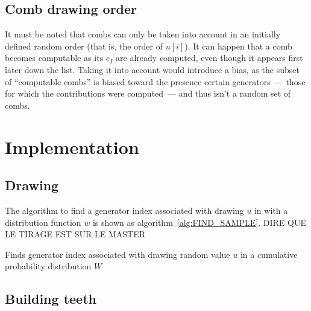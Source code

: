 \documentclass[./thesis.tex]{subfiles}
\begin{document}
\subsection{Comb drawing order}

It must be noted that combs can only be taken into account in an initially defined random order (that is, the order of $u[i]$).
It can happen that a comb becomes computable as its $e_I$ are already computed, even though it appears first later down the list. Taking it into account would introduce a bias, as the subset of ``computable combs'' is biased toward the presence certain generators ---~those for which the contributions were computed~--- and thus isn't a random set of combs.


\section{Implementation}


\subsection{Drawing}

The algorithm to find a generator index associated with drawing $u$ in with a distribution function $w$ is shown as algorithm~\ref{alg:FIND_SAMPLE}.
\alert{DIRE QUE LE TIRAGE EST SUR LE MASTER}

\begin{algorithm}
\caption[FIND\_SAMPLE]{Finds generator index associated with drawing random value $u$ in a cumulative probability distribution $W$}
\label{alg:FIND_SAMPLE}

	
	
\end{algorithm}




\subsection{Building teeth}
\end{document}
